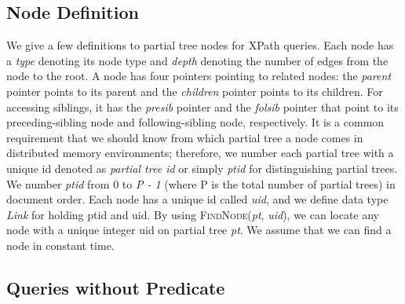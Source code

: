 \subsection{Node Definition}

We give a few definitions to partial tree nodes for XPath queries. Each node has a \textit{type} denoting its node type and \textit{depth} 
 denoting the number of edges from the node to the root. 
 A node has four pointers pointing to related nodes: the \textit{parent} pointer points to its parent 
 and the \textit{children} pointer points to its children. For accessing siblings, it has the \textit{presib} pointer 
 and the \textit{folsib} pointer that point to its preceding-sibling node and following-sibling node, respectively.  
It is a common requirement that we should know from which partial tree a node comes in distributed 
 memory environments; therefore, we number each partial tree with a unique id denoted as \textit{partial tree id} or 
 simply \textit{ptid} for distinguishing partial trees. We number \textit{ptid} from 0 to \textit{P - 1} 
 (where P is the total number of partial trees) in document order. 
 Each node has a unique id called \textit{uid}, and we define data type \textit{Link} for holding ptid and uid. 
 By using \textsc{FindNode}(\textit{pt}, \textit{uid}), we can locate any node with a unique integer uid on partial tree \textit{pt}. 
 We assume that we can find a node in constant time.  
 
\subsection{Queries without Predicate}

